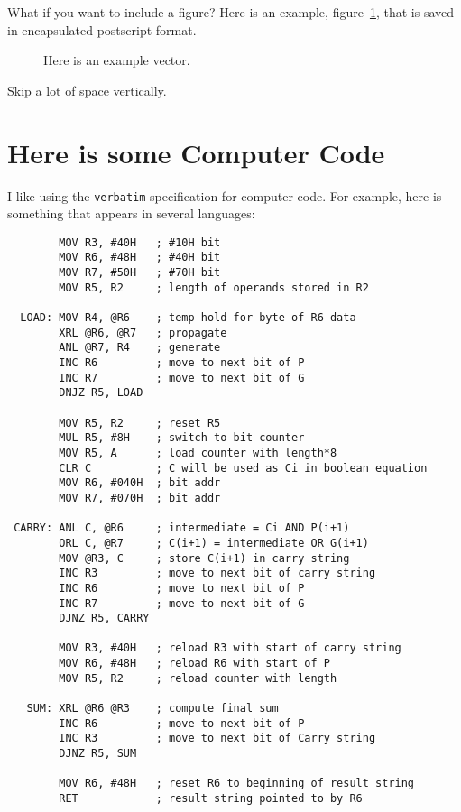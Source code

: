 \documentclass[final]{ieee}
\begin{document}
What if you want to include a figure?
Here is an example, figure~\ref{fig:phasor1}, that is saved in
encapsulated postscript format.

\begin{figure}[!hbt]
  \centering
  \caption{Here is an example vector.}
  \label{fig:phasor1}
\end{figure}


Skip a lot of space  \bigskip  vertically.

\section{Here is some Computer Code}\label{sec:code}

I like using the \verb"verbatim" specification for computer code.
For example, here is something that appears in several
languages:

\begin{verbatim}
        MOV R3, #40H   ; #10H bit
        MOV R6, #48H   ; #40H bit
        MOV R7, #50H   ; #70H bit
        MOV R5, R2     ; length of operands stored in R2

  LOAD: MOV R4, @R6    ; temp hold for byte of R6 data
        XRL @R6, @R7   ; propagate
        ANL @R7, R4    ; generate
        INC R6         ; move to next bit of P
        INC R7         ; move to next bit of G
        DNJZ R5, LOAD

        MOV R5, R2     ; reset R5
        MUL R5, #8H    ; switch to bit counter
        MOV R5, A      ; load counter with length*8
        CLR C          ; C will be used as Ci in boolean equation
        MOV R6, #040H  ; bit addr
        MOV R7, #070H  ; bit addr

 CARRY: ANL C, @R6     ; intermediate = Ci AND P(i+1)
        ORL C, @R7     ; C(i+1) = intermediate OR G(i+1)
        MOV @R3, C     ; store C(i+1) in carry string
        INC R3         ; move to next bit of carry string
        INC R6         ; move to next bit of P
        INC R7         ; move to next bit of G
        DJNZ R5, CARRY

        MOV R3, #40H   ; reload R3 with start of carry string
        MOV R6, #48H   ; reload R6 with start of P
        MOV R5, R2     ; reload counter with length

   SUM: XRL @R6 @R3    ; compute final sum
        INC R6         ; move to next bit of P
        INC R3         ; move to next bit of Carry string
        DJNZ R5, SUM

        MOV R6, #48H   ; reset R6 to beginning of result string
        RET            ; result string pointed to by R6

\end{verbatim}
\end{document}
